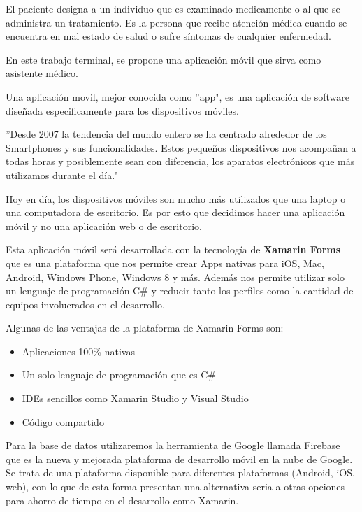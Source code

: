 El paciente designa a un individuo que es examinado medicamente o al que se administra un tratamiento\cite{Referencia9}. Es la persona que recibe atención médica cuando se encuentra en mal estado de salud o sufre síntomas de cualquier enfermedad.

En este trabajo terminal, se propone una aplicación móvil que sirva como asistente médico.

Una aplicación movil, mejor conocida como ''app", es una aplicación de software diseñada especificamente para los dispositivos móviles\cite{Referencia10}.

''Desde 2007 la tendencia del mundo entero se ha centrado alrededor de los Smartphones y sus funcionalidades. Estos pequeños dispositivos nos acompañan a todas horas y posiblemente sean con diferencia, los aparatos electrónicos que más utilizamos durante el día."\cite{Referencia11}

Hoy en día, los dispositivos móviles son mucho más utilizados que una laptop o una computadora de escritorio. Es por esto que decidimos hacer una aplicación móvil y no una aplicación web o de escritorio.

Esta aplicación móvil será desarrollada con la tecnología de \textbf{Xamarin Forms} que es una plataforma que nos permite crear Apps nativas para iOS, Mac, Android, Windows Phone, Windows 8 y más. Además nos permite utilizar solo un lenguaje de programación C\#  y  reducir tanto los perfiles como la cantidad de equipos involucrados en el desarrollo.\cite{Referencia12}

Algunas de las ventajas de la plataforma de Xamarin Forms son: 
\begin{itemize}
	\item Aplicaciones 100\% nativas
	\item Un solo lenguaje de programación que es C\#
	\item IDEs sencillos como Xamarin Studio y Visual Studio
	\item Código compartido
\end{itemize}

Para la base de datos utilizaremos la herramienta de Google llamada Firebase que es la nueva y mejorada plataforma de desarrollo móvil en la nube de Google. Se trata de una plataforma disponible para diferentes plataformas (Android, iOS, web), con lo que de esta forma presentan una alternativa seria a otras opciones para ahorro de tiempo en el desarrollo como Xamarin\cite{Referencia20}.


